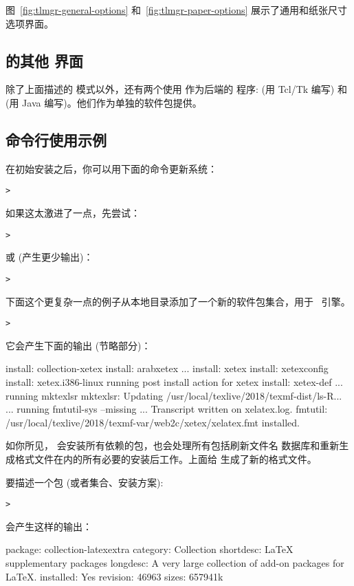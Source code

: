 \documentclass{article}
\begin{document}
图~\ref{fig:tlmgr-general-options} 和~\ref{fig:tlmgr-paper-options}
展示了通用和纸张尺寸选项界面。

\subsection{ 的其他 \GUI{} 界面}

除了上面描述的  模式以外，还有两个使用 
作为后端的 \GUI{} 程序:  (用 Tcl/Tk 编写) 和
 (用 Java 编写)。他们作为单独的软件包提供。

\subsection{ 命令行使用示例}

在初始安装之后，你可以用下面的命令更新系统：
\begin{alltt}
> 
\end{alltt}
如果这太激进了一点，先尝试：
\begin{alltt}
> 
\end{alltt}
或 (产生更少输出)：
\begin{alltt}
> 
\end{alltt}

下面这个更复杂一点的例子从本地目录添加了一个新的软件包集合，用于 \XeTeX\ 引擎。

\begin{alltt}
> 
\end{alltt}
它会产生下面的输出 (节略部分)：
\begin{fverbatim}
install: collection-xetex
install: arabxetex
...
install: xetex
install: xetexconfig
install: xetex.i386-linux
running post install action for xetex
install: xetex-def
...
running mktexlsr
mktexlsr: Updating /usr/local/texlive/2018/texmf-dist/ls-R...
...
running fmtutil-sys --missing
...
Transcript written on xelatex.log.
fmtutil: /usr/local/texlive/2018/texmf-var/web2c/xetex/xelatex.fmt installed.
\end{fverbatim}

如你所见， 会安装所有依赖的包，也会处理所有包括刷新文件名
数据库和重新生成格式文件在内的所有必要的安装后工作。上面给 \XeTeX{}
生成了新的格式文件。

要描述一个包 (或者集合、安装方案):
\begin{alltt}
> 
\end{alltt}
会产生这样的输出：
\begin{fverbatim}
package:    collection-latexextra
category:   Collection
shortdesc:  LaTeX supplementary packages
longdesc:   A very large collection of add-on packages for LaTeX.
installed:  Yes
revision:   46963
sizes:      657941k
\end{fverbatim}
\end{document}
